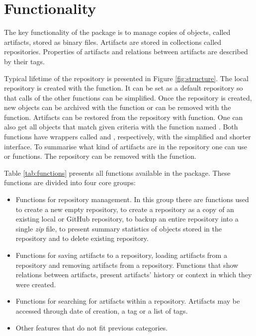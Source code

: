 \documentclass[nojss]{jss}\usepackage[]{graphicx}\usepackage[]{color}
\begin{document}
\section{Functionality}
\label{sec:func3}

The key functionality of the  package is to manage copies of  objects, called artifacts, stored as binary files. Artifacts are stored in collections called repositories. Properties of artifacts and relations between artifacts are described by their tags.

Typical lifetime of the repository is presented in Figure \ref{fig:structure}. The local repository is created with the  function. It can be set as a default repository so that calls of the other  functions can be simplified. 
Once the repository is created, new  objects can be archived with the  function or can be removed with the  function. Artifacts can be restored from the repository with  function. One can also get all objects that match given criteria with the function named . Both functions have wrappers called  and , respectively, with the simplified and shorter interface.
To summarise what kind of artifacts are in the repository one can use  or  functions. The repository can be removed with the  function.

Table \ref{tab:functions} presents all functions available in the  package. These functions are divided into four core groups:

\begin{itemize}
\item Functions for repository management. In this group there are functions used to create a new empty repository, to create a repository as a copy of an existing local or GitHub repository, to backup an entire repository into a single \textit{zip} file, to present summary statistics of objects stored in the repository and to delete existing repository.
\item Functions for saving artifacts to a repository, loading artifacts from a repository and removing artifacts from a repository. Functions that show relations between artifacts, present artifacts' history or context in which they were created.
\item Functions for searching for artifacts within a repository. Artifacts may be accessed through date of creation, a tag or a list of tags.
\item Other features that do not fit previous categories.
\end{itemize}
\end{document}
